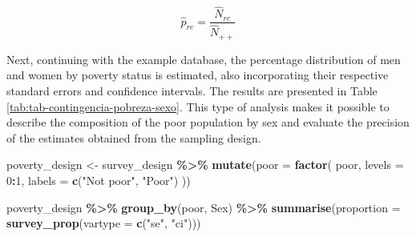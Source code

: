 \documentclass[
  english,
  12pt,
]{book}
\newenvironment{Shaded}{\begin{snugshade}}{\end{snugshade}}
\newcommand{\AttributeTok}[1]{\textcolor[rgb]{0.13,0.29,0.53}{#1}}
\newcommand{\DecValTok}[1]{\textcolor[rgb]{0.00,0.00,0.81}{#1}}
\newcommand{\FunctionTok}[1]{\textcolor[rgb]{0.13,0.29,0.53}{\textbf{#1}}}
\newcommand{\NormalTok}[1]{#1}
\newcommand{\OtherTok}[1]{\textcolor[rgb]{0.56,0.35,0.01}{#1}}
\newcommand{\SpecialCharTok}[1]{\textcolor[rgb]{0.81,0.36,0.00}{\textbf{#1}}}
\newcommand{\StringTok}[1]{\textcolor[rgb]{0.31,0.60,0.02}{#1}}
\begin{document}
\[
\hat{p}_{rc}=\frac{\hat{N}_{rc}}{\hat{N}_{++}}
\]

Next, continuing with the example database, the percentage distribution of men and women by poverty status is estimated, also incorporating their respective standard errors and confidence intervals. The results are presented in Table \ref{tab:tab-contingencia-pobreza-sexo}. This type of analysis makes it possible to describe the composition of the poor population by sex and evaluate the precision of the estimates obtained from the sampling design.

\begin{Shaded}
\begin{Highlighting}[]
\NormalTok{poverty\_design }\OtherTok{\textless{}{-}}\NormalTok{ survey\_design }\SpecialCharTok{\%\textgreater{}\%}
  \FunctionTok{mutate}\NormalTok{(}\AttributeTok{poor =} \FunctionTok{factor}\NormalTok{(}
\NormalTok{    poor,}
    \AttributeTok{levels =} \DecValTok{0}\SpecialCharTok{:}\DecValTok{1}\NormalTok{,}
    \AttributeTok{labels =} \FunctionTok{c}\NormalTok{(}\StringTok{"Not poor"}\NormalTok{, }\StringTok{"Poor"}\NormalTok{)}
\NormalTok{  ))}
\end{Highlighting}
\end{Shaded}

\begin{Shaded}
\begin{Highlighting}[]
\NormalTok{poverty\_design }\SpecialCharTok{\%\textgreater{}\%}
  \FunctionTok{group\_by}\NormalTok{(poor, Sex) }\SpecialCharTok{\%\textgreater{}\%}
  \FunctionTok{summarise}\NormalTok{(}\AttributeTok{proportion =} \FunctionTok{survey\_prop}\NormalTok{(}\AttributeTok{vartype =} \FunctionTok{c}\NormalTok{(}\StringTok{"se"}\NormalTok{, }\StringTok{"ci"}\NormalTok{)))}
\end{Highlighting}
\end{Shaded}
\end{document}
